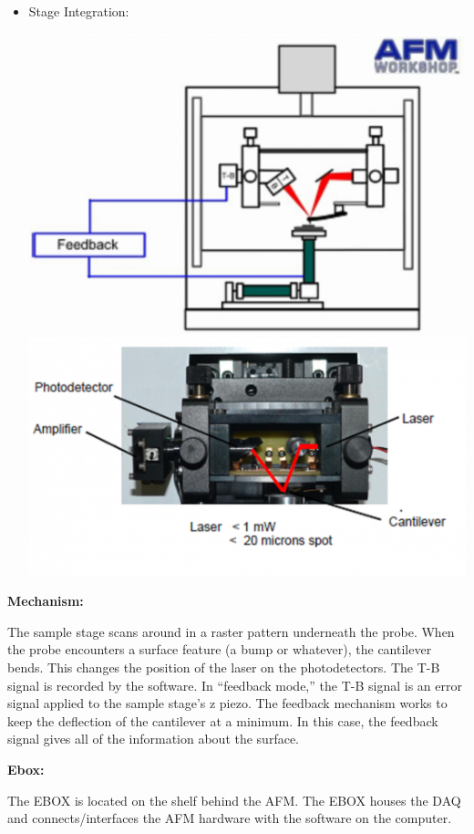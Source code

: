 \documentclass{../lab}
\begin{document}
\begin{itemize}
    \item Stage Integration:
    \begin{center}
        \href{http://experimentationlab.berkeley.edu/sites/default/files/AFMImages/AFMdiagram.png}{\includegraphics[width=0.33\linewidth,keepaspectratio]{images/AFMdiagram.png}}
        \href{http://experimentationlab.berkeley.edu/sites/default/files/AFMImages/AFMstage2.PNG}{\includegraphics[width=0.5\linewidth,keepaspectratio]{images/AFMstage2.PNG}}
    \end{center}

\end{itemize}

\noindent\textbf{Mechanism:}

The sample stage scans around in a raster pattern underneath the probe. When the probe encounters a surface feature (a bump or whatever), the cantilever bends. This changes the position of the laser on the photodetectors. The T-B signal is recorded by the software. In ``feedback mode,'' the T-B signal is an error signal applied to the sample stage's z piezo. The feedback mechanism works to keep the deflection of the cantilever at a minimum. In this case, the feedback signal gives all of the information about the surface.

\noindent\textbf{Ebox:}

The EBOX is located on the shelf behind the AFM. The EBOX houses the DAQ and connects/interfaces the AFM hardware with the software on the computer.
\end{document}
